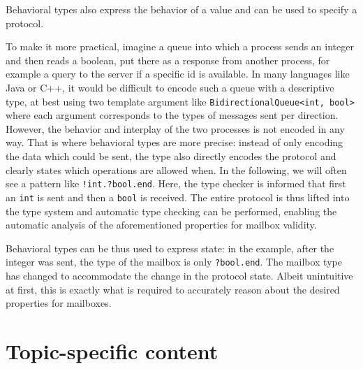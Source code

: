 Behavioral types also express the behavior of a value and can be used to specify a protocol\cite{huttelFoundationsSessionTypes2016}.

To make it more practical, imagine a queue into which a process sends an integer and then reads a boolean, put there as a response from another process, for example a query to the server if a specific id is available.
In many languages like Java or C++, it would be difficult to encode such a queue with a descriptive type, at best using two template argument like \lstinline{BidirectionalQueue<int, bool>} where each argument corresponds to the types of messages sent per direction.
However, the behavior and interplay of the two processes is not encoded in any way.
That is where behavioral types are more precise: instead of only encoding the data which could be sent, the type also directly encodes the protocol and clearly states which operations are allowed when.
In the following, we will often see a pattern like \lstinline{!int.?bool.end}.
Here, the type checker is informed that first an \lstinline{int} is sent and then a \lstinline{bool} is received.
The entire protocol is thus lifted into the type system and automatic type checking can be performed, enabling the automatic analysis of the aforementioned properties for mailbox validity.

Behavioral types can be thus used to express state: in the example, after the integer was sent, the type of the mailbox is only \lstinline{?bool.end}.
The mailbox type has changed to accommodate the change in the protocol state.
Albeit unintuitive at first, this is exactly what is required to accurately reason about the desired properties for mailboxes.





\section{Topic-specific content}
\label{sec:contentSummary}

